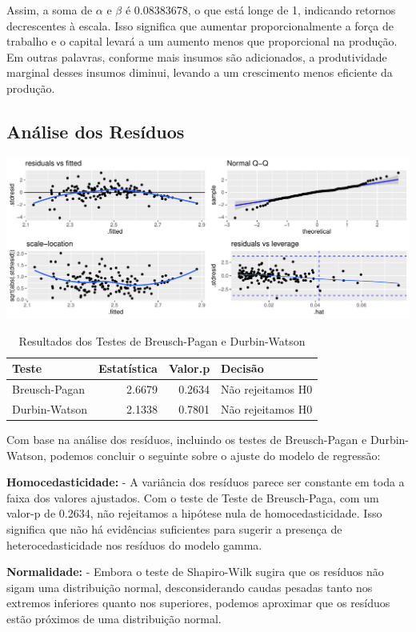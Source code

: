 \documentclass[
  letterpaper,
  DIV=11,
  numbers=noendperiod]{scrreprt}
\begin{document}
Assim, a soma de \(\alpha\) e \(\beta\) é 0.08383678, o que está longe
de 1, indicando retornos decrescentes à escala. Isso significa que
aumentar proporcionalmente a força de trabalho e o capital levará a um
aumento menos que proporcional na produção. Em outras palavras, conforme
mais insumos são adicionados, a produtividade marginal desses insumos
diminui, levando a um crescimento menos eficiente da produção.

\subsection{Análise dos Resíduos}\label{anuxe1lise-dos-resuxedduos-1}

\includegraphics{trabalho_files/figure-pdf/Gráfico de Análise de resíduos-1.pdf}

\begin{longtable}[t]{lrrl}
\caption{\label{tab:unnamed-chunk-23}Resultados dos Testes de Breusch-Pagan e Durbin-Watson}\\
\toprule
Teste & Estatística & Valor.p & Decisão\\
\midrule
Breusch-Pagan & 2.6679 & 0.2634 & Não rejeitamos H0\\
Durbin-Watson & 2.1338 & 0.7801 & Não rejeitamos H0\\
\bottomrule
\end{longtable}

Com base na análise dos resíduos, incluindo os testes de Breusch-Pagan e
Durbin-Watson, podemos concluir o seguinte sobre o ajuste do modelo de
regressão:

\textbf{Homocedasticidade:} - A variância dos resíduos parece ser
constante em toda a faixa dos valores ajustados. Com o teste de Teste de
Breusch-Paga, com um valor-p de 0.2634, não rejeitamos a hipótese nula
de homocedasticidade. Isso significa que não há evidências suficientes
para sugerir a presença de heterocedasticidade nos resíduos do modelo
gamma.

\textbf{Normalidade:} - Embora o teste de Shapiro-Wilk sugira que os
resíduos não sigam uma distribuição normal, desconsiderando caudas
pesadas tanto nos extremos inferiores quanto nos superiores, podemos
aproximar que os resíduos estão próximos de uma distribuição normal.
\end{document}
